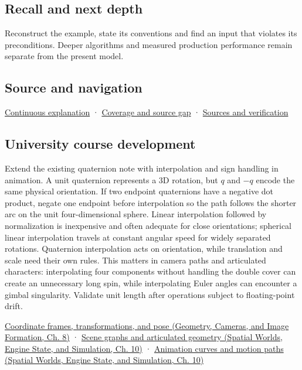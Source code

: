\subsection{Recall and next depth}\label{appendix-8e61ab68f6b2-recall-and-next-depth}

Reconstruct the example, state its conventions and find an input that violates its preconditions. Deeper algorithms and measured production performance remain separate from the present model.

\subsection{Source and navigation}\label{appendix-8e61ab68f6b2-source-and-navigation}

\hyperref[01-foundations-i-ch018-keep-the-promises-visible-while-moving-between-representations]{Continuous explanation} · \hyperref[appendix-fd090d982a15-phase-7---parts-601-700]{Coverage and source gap} · \hyperref[appendix-a103e7846d21-phase-7---source-analysis-and-verification]{Sources and verification}

\subsection{University course development}\label{appendix-8e61ab68f6b2-university-course-development}

Extend the existing quaternion note with interpolation and sign handling in animation. A unit quaternion represents a 3D rotation, but \(q\) and \(-q\) encode the same physical orientation. If two endpoint quaternions have a negative dot product, negate one endpoint before interpolation so the path follows the shorter arc on the unit four-dimensional sphere. Linear interpolation followed by normalization is inexpensive and often adequate for close orientations; spherical linear interpolation travels at constant angular speed for widely separated rotations. Quaternion interpolation acts on orientation, while translation and scale need their own rules. This matters in camera paths and articulated characters: interpolating four components without handling the double cover can create an unnecessary long spin, while interpolating Euler angles can encounter a gimbal singularity. Validate unit length after operations subject to floating-point drift.

\href{../03-Geometry-Cameras-and-Image-Formation/main.pdf\#nameddest=03-visual-computing-i-ch001-coordinate-frames-transformations-and-pose}{Coordinate frames, transformations, and pose (Geometry, Cameras, and Image Formation, Ch. 8)} · \href{../05-Spatial-Worlds-Engine-State-and-Simulation/main.pdf\#nameddest=04-visual-computing-ii-ch029-scene-graphs-and-articulated-geometry}{Scene graphs and articulated geometry (Spatial Worlds, Engine State, and Simulation, Ch. 10)} · \href{../05-Spatial-Worlds-Engine-State-and-Simulation/main.pdf\#nameddest=04-visual-computing-ii-ch029-animation-curves-and-motion-paths}{Animation curves and motion paths (Spatial Worlds, Engine State, and Simulation, Ch. 10)}
